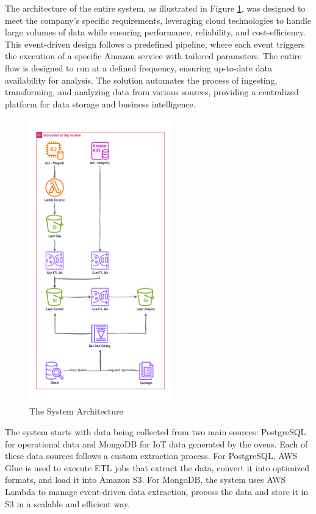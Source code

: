 The architecture of the entire system, as illustrated in Figure \ref{fig:wholesystem}, was designed to meet the company's specific requirements, leveraging cloud technologies to handle large volumes of data while ensuring performance, reliability, and cost-efficiency. This event-driven design follows a predefined pipeline, where each event triggers the execution of a specific Amazon service with tailored parameters. The entire flow is designed to run at a defined frequency, ensuring up-to-date data availability for analysis. The solution automates the process of ingesting, transforming, and analyzing data from various sources, providing a centralized platform for data storage and business intelligence.

\begin{figure}[h!]
    \centering
    \includegraphics[width=0.55\textwidth]{res/datalake-system.pdf}
    \caption{The System Architecture}
    \label{fig:wholesystem}
\end{figure}

The system starts with data being collected from two main sources: PostgreSQL for operational data and MongoDB for \ac{IoT} data generated by the ovens. Each of these data sources follows a custom extraction process. For PostgreSQL, \ac{AWS} Glue is used to execute \ac{ETL} jobs that extract the data, convert it into optimized formats, and load it into Amazon \ac{S3}. For MongoDB, the system uses \ac{AWS} Lambda to manage event-driven data extraction, process the data and store it in \ac{S3} in a scalable and efficient way.

